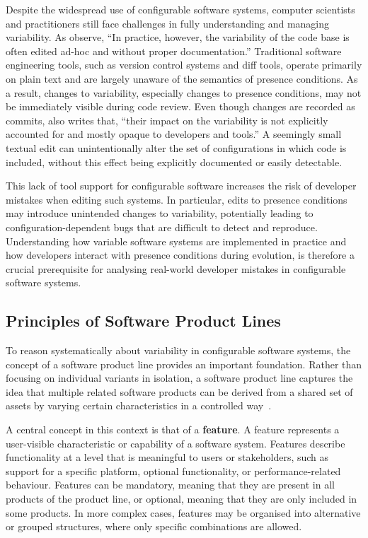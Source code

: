 Despite the widespread use of configurable software systems, computer scientists and practitioners still face challenges in fully understanding and managing variability. As \textcite{Bittner2022_edits} observe, ``In practice, however, the variability of the code base is often edited ad-hoc and without proper documentation.'' Traditional software engineering tools, such as version control systems and diff tools, operate primarily on plain text and are largely unaware of the semantics of presence conditions. As a result, changes to variability, especially changes to presence conditions, may not be immediately visible during code review. Even though changes are recorded as commits, \textcite{Bittner2022_edits} also writes that, ``their impact on the variability is not explicitly accounted for and mostly opaque to developers and tools.'' A seemingly small textual edit can unintentionally alter the set of configurations in which code is included, without this effect being explicitly documented or easily detectable.

This lack of tool support for configurable software increases the risk of developer mistakes when editing such systems. In particular, edits to presence conditions may introduce unintended changes to variability, potentially leading to configuration-dependent bugs that are difficult to detect and reproduce. Understanding how variable software systems are implemented in practice and how developers interact with presence conditions during evolution, is therefore a crucial prerequisite for analysing real-world developer mistakes in configurable software systems.

\subsection{Principles of Software Product Lines}
%
To reason systematically about variability in configurable software systems, the concept of a software product line provides an important foundation. Rather than focusing on individual variants in isolation, a software product line captures the idea that multiple related software products can be derived from a shared set of assets by varying certain characteristics in a controlled way~\cite{apel2013_featureOrientedSoftwareProductLines}.

A central concept in this context is that of a \textbf{feature}. A feature represents a user-visible characteristic or capability of a software system. Features describe functionality at a level that is meaningful to users or stakeholders, such as support for a specific platform, optional functionality, or performance-related behaviour. Features can be mandatory, meaning that they are present in all products of the product line, or optional, meaning that they are only included in some products. In more complex cases, features may be organised into alternative or grouped structures, where only specific combinations are allowed.

